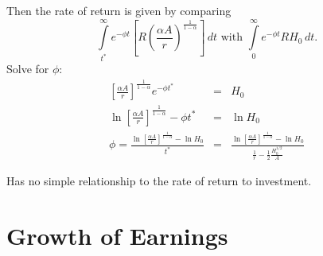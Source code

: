 \documentclass[12pt,compress,handout]{beamer}  %
\begin{document}
\begin{frame}

\footnotesize

Then the rate of return is given by comparing \small
\begin{equation*}
    \int\limits_{t^{*}}^{\infty}
        e^{-\phi t}
        \left[
            R \left(\frac{\alpha A}{r}\right)^{\frac{1}{1-\alpha}}
        \right]\,dt
    \text{ with }
    \int\limits_{0}^{\infty} e^{-\phi t} R H_0\,dt.
\end{equation*}
Solve for $\phi$:
\begin{eqnarray*}
    \left[ \frac{\alpha A}{r}\right]^{\frac{1}{1-\alpha}} e^{-\phi t^{*}}
    &=&
    H_0\\
    \ln \left[ \frac{\alpha A}{r}\right]^{\frac{1}{1-\alpha}} - \phi t^{*}
    &=&
    \ln H_0\\
    \phi
    =
    \frac{\ln \left[ \frac{\alpha A}{r}\right]^{\frac{1}{1-\alpha}} - \ln H_0}{t^{*}}
    &=&
    \frac{\ln \left[ \frac{\alpha A}{r}\right]^{\frac{1}{1-\alpha}} - \ln H_0}
        {\frac{1}{r}-\frac{1}{2}\frac{H_0^{1/2}}{A}}
\end{eqnarray*}

Has no simple relationship to the rate of return to investment.
\end{frame}


\section[Growth]{Growth of Earnings}


\begin{frame}
\begin{center}
    \textbf{\insertsection}
\end{center}
\end{frame}
\end{document}

